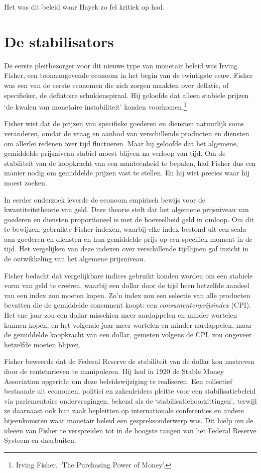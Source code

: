 \documentclass[
  a5paper,
  smalldemyvopaper,11pt,twoside,onecolumn,openright,extrafontsizes]{memoir}
\begin{document}
Het was dit beleid waar Hayek zo fel kritiek op had.

\section{De stabilisators}\label{de-stabilisators}

De eerste pleitbezorger voor dit nieuwe type van monetair beleid was
Irving Fisher, een toonaangevende econoom in het begin van de twintigste
eeuw. Fisher was een van de eerste economen die zich zorgen maakten over
deflatie, of specifieker, de deflatoire schuldenspiraal. Hij geloofde
dat alleen stabiele prijzen `de kwalen van monetaire instabiliteit'
konden voorkomen.\footnote{\hspace{0pt}Irving Fisher, `The Purchasing
  Power of Money'.}

Fisher wist dat de prijzen van specifieke goederen en diensten
natuurlijk soms veranderen, omdat de vraag en aanbod van verschillende
producten en diensten om allerlei redenen over tijd fluctueren. Maar hij
geloofde dat het algemene, gemiddelde prijsniveau stabiel moest blijven
na verloop van tijd. Om de stabiliteit van de koopkracht van een
munteenheid te bepalen, had Fisher dus een manier nodig om gemiddelde
prijzen vast te stellen. En hij wist precies waar hij moest zoeken.

In eerder onderzoek leverde de econoom empirisch bewijs voor de
kwantiteitstheorie van geld. Deze theorie stelt dat het algemene
prijsniveau van goederen en diensten proportioneel is met de hoeveelheid
geld in omloop. Om dit te bewijzen, gebruikte Fisher indexen, waarbij
elke index bestond uit een scala aan goederen en diensten en hun
gemiddelde prijs op een specifiek moment in de tijd. Het vergelijken van
deze indexen over verschillende tijdlijnen gaf inzicht in de
ontwikkeling van het algemene prijsniveau.

Fisher bedacht dat vergelijkbare indices gebruikt konden worden om een
stabiele vorm van geld te creëren, waarbij een dollar door de tijd heen
hetzelfde aandeel van een index zou moeten kopen. Zo'n index zou een
selectie van alle producten bevatten die de gemiddelde consument koopt:
een \emph{consumentenprijsindex} (CPI). Het ene jaar zou een dollar
misschien meer aardappelen en minder wortelen kunnen kopen, en het
volgende jaar meer wortelen en minder aardappelen, maar de gemiddelde
koopkracht van een dollar, gemeten volgens de CPI, zou ongeveer
hetzelfde moeten blijven.

Fisher beweerde dat de Federal Reserve de stabiliteit van de dollar kon
nastreven door de rentetarieven te manipuleren. Hij had in 1920 de
Stable Money Association opgericht om deze beleidswijziging te
realiseren. Een collectief bestaande uit economen, politici en
zakenleiders pleitte voor een stabilisatiebeleid via parlementaire
ondervragingen, bekend als de `stabilisatiehoorzittingen', terwijl ze
daarnaast ook hun zaak bepleitten op internationale conferenties en
andere bijeenkomsten waar monetair beleid een gespreksonderwerp was. Dit
hielp om de ideeën van Fisher te verspreiden tot in de hoogste rangen
van het Federal Reserve Systeem en daarbuiten.
\end{document}
